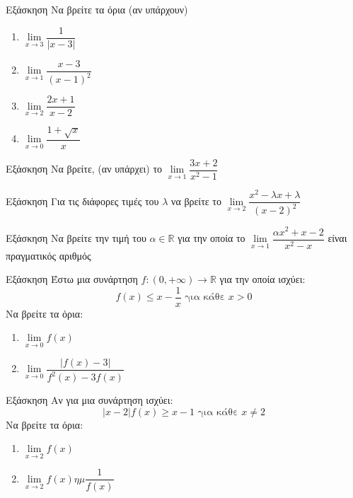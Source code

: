 \documentclass[greek]{beamer}
\begin{document}
\begin{frame}{Εξάσκηση}
  Να βρείτε τα όρια (αν υπάρχουν)
  \begin{enumerate}
    \item $\lim\limits_{x \to 3}{ \dfrac{1}{|x-3|} }$ \pause
    \item $\lim\limits_{x \to 1}{ \dfrac{x-3}{(x-1)^2} }$ \pause
    \item $\lim\limits_{x \to 2}{ \dfrac{2x+1}{x-2} }$ \pause
    \item $\lim\limits_{x \to 0}{ \dfrac{1+\sqrt{x}}{x}}$
  \end{enumerate}
\end{frame}

\begin{frame}{Εξάσκηση}
  Να βρείτε, (αν υπάρχει) το $\lim\limits_{x \to 1}{ \dfrac{3x+2}{x^2-1} }$
\end{frame}

\begin{frame}{Εξάσκηση}
  Για τις διάφορες τιμές του $λ$ να βρείτε το $\lim\limits_{x \to 2}{ \dfrac{x^2-λx+λ}{(x-2)^2} }$
\end{frame}

\begin{frame}{Εξάσκηση}
  Να βρείτε την τιμή του $α\in\mathbb{R}$ για την οποία το $\lim\limits_{x \to 1}{\dfrac{αx^2+x-2}{x^2-x}  }$ είναι πραγματικός αριθμός
\end{frame}

\begin{frame}{Εξάσκηση}
  Έστω μια συνάρτηση $f:(0,+\infty)\to\mathbb{R}$ για την οποία ισχύει:
  $$f(x)\le x-\dfrac{1}{x} \text{ για κάθε } x>0$$
  Να βρείτε τα όρια:
  \begin{enumerate}
    \item $\lim\limits_{x \to 0}{ f(x) }$ \pause
    \item $\lim\limits_{x \to 0}{ \dfrac{|f(x)-3|}{f^2(x)-3f(x)} }$
  \end{enumerate}
\end{frame}

\begin{frame}{Εξάσκηση}
  Αν για μια συνάρτηση ισχύει:
  $$|x-2|f(x)\ge x-1 \text{ για κάθε } x\ne 2$$
  Να βρείτε τα όρια:
  \begin{enumerate}
    \item $\lim\limits_{x \to 2}{ f(x) }$ \pause
    \item $\lim\limits_{x \to 2}{ f(x)ημ\dfrac{1}{f(x)} }$
  \end{enumerate}
\end{frame}
\end{document}
